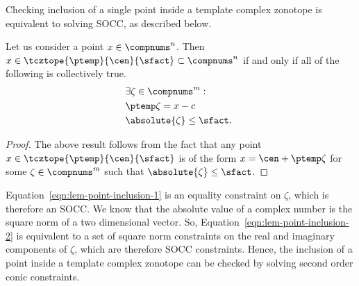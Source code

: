 Checking inclusion of a single point inside a template complex
zonotope is equivalent to solving SOCC, as described below.
%
\begin{lemma}
Let us consider a point $x\in\compnums^n$.  Then
$x\in\tcztope{\ptemp}{\cen}{\sfact}\subset\compnums^n$ if and only if
all of the following is collectively true.
%
\begin{align}
& \exists\zeta\in\compnums^m:\nonumber\\
& \ptemp\zeta = x-c~\label{eqn:lem-point-inclusion-1}\\
& \absolute{\zeta}\leq \sfact.~\label{eqn:lem-point-inclusion-2}
\end{align}
%
\end{lemma}
%
\begin{proof}
The above result follows from the fact that any point 
$x\in\tcztope{\ptemp}{\cen}{\sfact}$ is of the form
$x=\cen+\ptemp\zeta$ for some $\zeta\in\compnums^m$ such that
$\absolute{\zeta}\leq \sfact$.
\end{proof}
%
Equation~\ref{eqn:lem-point-inclusion-1} is an equality constraint on
$\zeta$, which is therefore an SOCC.  We know that the absolute value
of a complex number is the square norm of a two dimensional vector.
So, Equation~\ref{eqn:lem-point-inclusion-2} is equivalent to a set of
square norm constraints on the real and imaginary components of
$\zeta$, which are therefore SOCC constraints.  Hence, the inclusion
of a point inside a template complex zonotope can be checked by
solving second order conic constraints.

